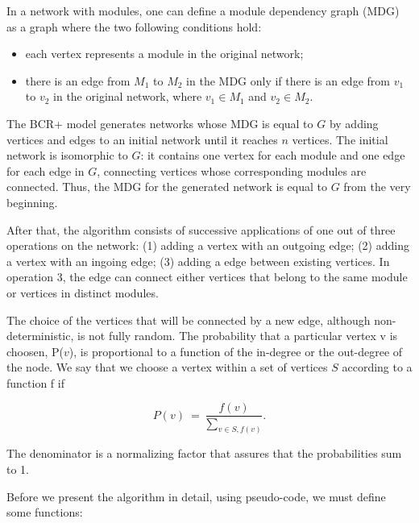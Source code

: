 In a network with modules, one can define a module dependency graph (MDG) as a
graph where the two following conditions hold: 

\begin{itemize}
\item each vertex represents a module in the original network; 
\item there is an edge from $M_1$ to $M_2$ in the MDG only if there is an edge
from $v_1$ to $v_2$ in the original network, where $v_1 \in M_1$ and $v_2 \in
M_2$.
\end{itemize}

The BCR+ model generates networks whose MDG is equal to $G$ by adding vertices
and edges to an initial network until it reaches $n$ vertices. The initial
network is isomorphic to $G$: it contains one vertex for each module and one
edge for each edge in $G$, connecting vertices whose corresponding modules are
connected. Thus, the MDG for the generated network is equal to $G$ from the very
beginning.

After that, the algorithm consists of successive applications of one out of
three operations on the network: (1) adding a vertex with an outgoing edge; (2)
adding a vertex with an ingoing edge; (3) adding a edge between existing
vertices. In operation 3, the edge can connect either vertices that belong
to the same module or vertices in distinct modules. 

The choice of the vertices that will be connected by a new edge, although
non-deterministic, is not fully random. The probability that a particular vertex
v is choosen, P($v$), is proportional to a function of the in-degree or the
out-degree of the node. We say that we choose a vertex within a set of vertices
$S$ according to a function f if

$$
  P(v) ~=~ \frac{ f(v) }{ \sum_{v \in S, f(v)} }.
$$

The denominator is a normalizing factor that assures that the probabilities sum
to 1.

Before we present the algorithm in detail, using pseudo-code, we must define
some functions:


